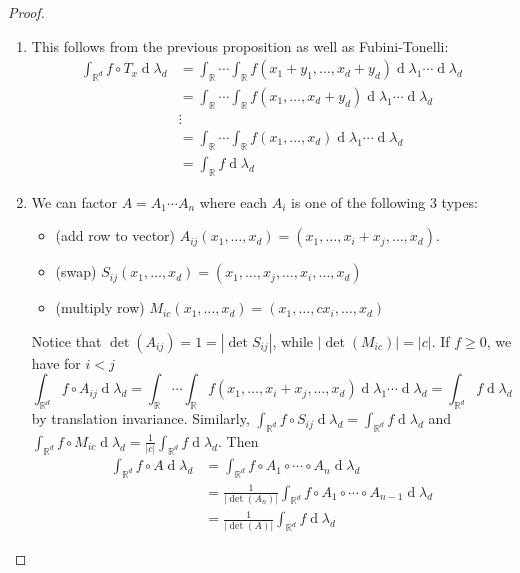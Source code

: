 \documentclass[12pt, a4paper]{memoir}
\DeclareMathOperator{\R}{{\mathbb{R}}}
\theoremstyle{nonumberplain}
\newtheorem{proof}{Proof}
\renewcommand{\d}[1]{\ensuremath{\operatorname{d}\!{#1}}} %
\begin{document}
\begin{proof}
    \begin{enumerate}[label=(\roman*)]
        \item This follows from the previous proposition as well as Fubini-Tonelli:
            \begin{align*}
                \int_{\R^d}f\circ T_x\d{\lambda_d} &= \int_{\R}\cdots\int_{\R}f(x_1+y_1,\ldots,x_d+y_d)\d{\lambda_1}\cdots\d{\lambda_d}\\
                                                   &= \int_{\R}\cdots\int_{\R}f(x_1,\ldots,x_d+y_d)\d{\lambda_1}\cdots\d{\lambda_d}\\
                                                   &\vdots\\
                                                   &= \int_{\R}\cdots\int_{\R}f(x_1,\ldots,x_d)\d{\lambda_1}\cdots\d{\lambda_d}\\
                                                   &= \int_{\R}f\d{\lambda_d}
            \end{align*}
        \item We can factor $A=A_1\cdots A_n$ where each $A_i$ is one of the following 3 types:
            \begin{itemize}[nolistsep]
                \item (add row to vector) $A_{ij}(x_1,\ldots,x_d)=(x_1,\ldots,x_i+x_j,\ldots,x_d)$.
                \item (swap) $S_{ij}(x_1,\ldots,x_d)=(x_1,\ldots,x_j,\ldots,x_i,\ldots,x_d)$
                \item (multiply row) $M_{ic}(x_1,\ldots,x_d)=(x_1,\ldots,cx_i,\ldots,x_d)$
            \end{itemize}
            Notice that $\det(A_{ij})=1=|\det S_{ij}|$, while $|\det(M_{ic})|=|c|$.
            If $f\geq 0$, we have for $i<j$
            \begin{equation*}
                \int_{\R^d}f\circ A_{ij}\d{\lambda_d}=\int_{\R}\cdots\int_{\R} f(x_1,\ldots,x_i+x_j,\ldots,x_d)\d{\lambda_1}\cdots\d{\lambda_d}=\int_{\R^d}f\d{\lambda_d}
            \end{equation*}
            by translation invariance.
            Similarly, $\int_{\R^d}f\circ S_{ij}\d{\lambda_d}=\int_{\R^d}f\d{\lambda_d}$ and $\int_{\R^d}f\circ M_{ic}\d{\lambda_d}=\frac{1}{|c|}\int_{\R^d}f\d{\lambda_d}$.
            Then
            \begin{align*}
                \int_{\R^d}f\circ A\d{\lambda_d} &= \int_{\R^d}f\circ A_1\circ\cdots\circ A_n\d{\lambda_d}\\
                                                 &=\frac{1}{|\det(A_n)|}\int_{\R^d}f\circ A_1\circ\cdots\circ A_{n-1}\d{\lambda_d}\\
                                                 &= \frac{1}{|\det(A)|}\int_{\R^d}f\d{\lambda_d}
            \end{align*}
    \end{enumerate}
\end{proof}
\end{document}
